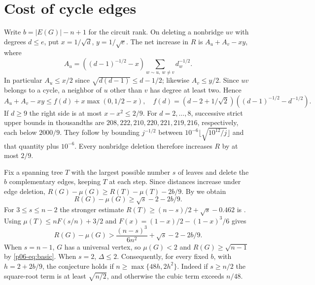 \documentclass[11pt,a4paper]{article}
\begin{document}
\section{Cost of cycle edges}\label{p06-sec:cycleloss}
Write $b=|E(G)|-n+1$ for the circuit rank. On deleting a nonbridge
$uv$ with degrees $d\le e$, put $x=1/\sqrt d$, $y=1/\sqrt e$.
The net increase in $R$ is $A_u+A_v-xy$, where
\[
 A_u=((d-1)^{-1/2}-x)\sum_{w\sim u,\ w\ne v}d_w^{-1/2}.
\]
In particular $A_u\le x/2$ since
$\sqrt{d(d-1)}\le d-1/2$; likewise $A_v\le y/2$.
Since $uv$ belongs to a cycle, a neighbor of $u$ other than $v$ has
degree at least two. Hence
\[
 A_u+A_v-xy\le f(d)+x\max(0,1/2-x),\quad
 f(d)=(d-2+1/\sqrt2)((d-1)^{-1/2}-d^{-1/2}).
\]
If $d\ge9$ the right side is at most $x-x^2\le 2/9$. For $d=2,\ldots,8$,
successive strict upper bounds in thousandths are
$208,222,210,220,221,219,216$, respectively, each below $2000/9$.
They follow by bounding $j^{-1/2}$ between
$10^{-6}\lfloor\sqrt{10^{12}/j}\rfloor$ and that quantity plus $10^{-6}$.
Every nonbridge deletion therefore increases $R$ by at most $2/9$.

Fix a spanning tree $T$ with the largest possible number $s$ of leaves
and delete the $b$ complementary edges, keeping $T$ at each step.
Since distances increase under edge deletion, $R(G)-\mu(G)\ge
R(T)-\mu(T)-2b/9$. By \cite[Theorem~1.2]{p06-CPSMean} we obtain
\[
 R(G)-\mu(G)\ge\sqrt{s}-2-2b/9.
\]
For $3\le s\le n-2$ the stronger estimate
$R(T)\ge(n-s)/2+\sqrt{s}-0.462$ is
\cite[Corollary~2.3]{p06-CPSMean}. Using $\mu(T)\le nF(s/n)+3/2$ and
$F(x)=(1-x)/2-(1-x)^3/6$ gives
\[
 R(G)-\mu(G)>\frac{(n-s)^3}{6n^2}+\sqrt{s}-2-2b/9.
\]
When $s=n-1$, $G$ has a universal vertex, so $\mu(G)<2$ and
$R(G)\ge\sqrt{n-1}$ by \eqref{p06-eq:basic}. When $s=2$, $\Delta\le2$. Consequently,
for every fixed $b$, with $h=2+2b/9$, the conjecture holds if
$n\ge\max\{48h,2h^2\}$. Indeed if $s\ge n/2$ the square-root term
is at least $\sqrt{n/2}$, and otherwise the cubic term exceeds $n/48$.
\end{document}
